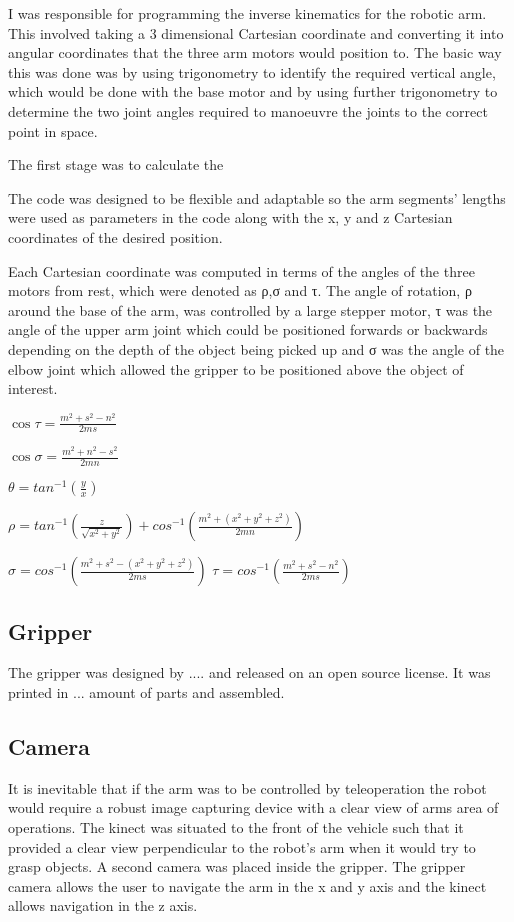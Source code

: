 I was responsible for programming the inverse kinematics for the robotic arm.  This involved taking a 3 dimensional Cartesian coordinate and converting it into angular coordinates that the three arm motors would position to.  The basic way this was done was by using trigonometry to identify the required vertical angle, which would be done with the base motor and by using further trigonometry to determine the two joint angles required to manoeuvre the joints to the correct point in space.

The first stage was to calculate the 	

The code was designed to be flexible and adaptable so the arm segments’ lengths were used as parameters in the code along with the x, y and z Cartesian coordinates of the desired position.

Each Cartesian coordinate was computed in terms of the angles of the three motors from rest, which were denoted as ρ,σ and τ.  The angle of rotation, ρ around the base of the arm, was controlled by a large stepper motor, τ was the angle of the upper arm joint which could be positioned forwards or backwards depending on the depth of the object being picked up and σ was the angle of the elbow joint which allowed the gripper to be positioned above the object of interest.  


$\cos \tau = \frac{m^{2}+s^{2}-n^{2}}{2ms}$


$\cos \sigma  = \frac{m^{2}+n^{2}-s^{2}}{2mn}$


$\theta = tan^{-1}\left (  \frac{y}{x}\right )$

$\rho = tan^{-1}\left ( \frac{z}{\sqrt{{x^{2}+y^{2}}}} \right )+ cos^{-1}\left ( \frac{m^{2}+(x^{2}+y^{2}+z^{2})}{2mn} \right )$

$\sigma = cos^{-1}\left (\frac{m^{2}+s^{2}-(x^{2}+y^{2}+z^{2})}{2ms} \right )$
$\tau = cos^{-1}\left (\frac{m^{2}+s^{2}-n^{2}}{2ms}\right )$

\subsection{Gripper}
The gripper was designed by .... and released on an open source license. It was printed in ... amount of parts and assembled.

\subsection{Camera}
It is inevitable that if the arm was to be controlled by teleoperation the robot would require a robust image capturing device with a clear view of arms area of operations. The kinect was situated to the front of the vehicle such that it provided a clear view perpendicular to the robot’s arm when it would try to grasp objects. A second camera was placed inside the gripper. The gripper camera allows the user to navigate the arm in the x and y axis and the kinect allows navigation in the z axis. 

